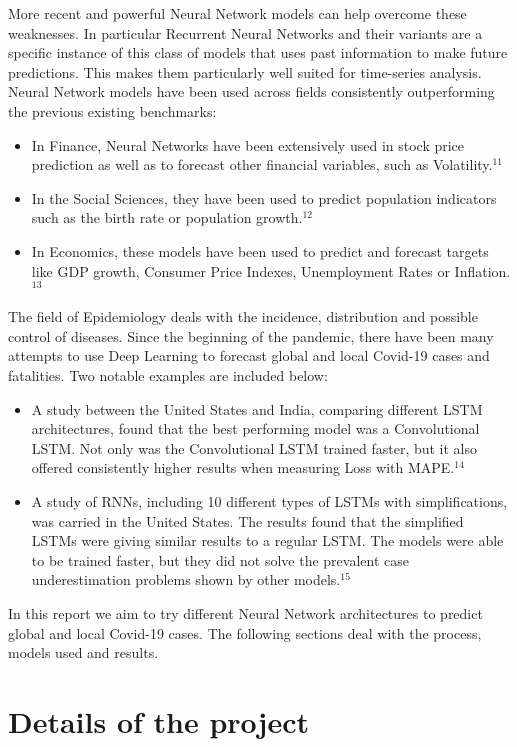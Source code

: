 \documentclass{article}
\begin{document}
More recent and powerful Neural Network models can help overcome these weaknesses. In particular Recurrent Neural Networks and their variants are a specific instance of this class of models that uses past information to make future predictions. This makes them particularly well suited for time-series analysis. Neural Network models have been used across fields consistently outperforming the previous existing benchmarks:
\begin{itemize}
\item In Finance, Neural Networks have been extensively used in stock price prediction as well as to forecast other financial variables, such as Volatility.$^{11}$
\item In the Social Sciences, they have been used to predict population indicators such as the birth rate or population growth.$^{12}$
\item In Economics, these models have been used to predict and forecast targets like GDP growth, Consumer Price Indexes, Unemployment Rates or Inflation.$^{13}$
\end{itemize}

The field of Epidemiology deals with the incidence, distribution and possible control of diseases. Since the beginning of the pandemic, there have been many attempts to use Deep Learning to forecast global and local Covid-19 cases and fatalities. Two notable examples are included below:
\begin{itemize}
\item A study between the United States and India, comparing different LSTM architectures, found that the best performing model was a Convolutional LSTM. Not only was the Convolutional LSTM trained faster, but it also offered consistently higher results when measuring Loss with MAPE.$^{14}$
\item A study of RNNs, including 10 different types of LSTMs with simplifications, was carried in the United States. The results found that the simplified LSTMs were giving similar results to a regular LSTM. The models were able to be trained faster, but they did not solve the prevalent case underestimation problems shown by other models.$^{15}$
\end{itemize}

In this report we aim to try different Neural Network architectures to predict global and local Covid-19 cases. The following sections deal with the process, models used and results.

\section{Details of the project}
\end{document}
